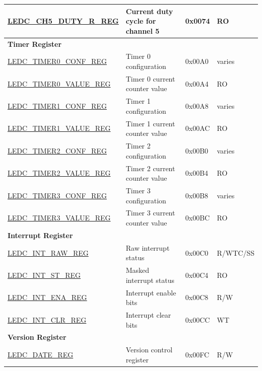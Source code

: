 \begin{longtable}{ | p{5.5cm} | p{7.2cm} | p{1.3cm} | p{1.5cm} | }
\hyperref[regdesc:LEDCCHNDUTYRREG]{LEDC\_CH5\_DUTY\_R\_REG} & Current duty cycle for channel 5 & 0x0074 & RO \\ \hline
\multicolumn{4}{|l|}{\textbf{Timer Register}} \\ \hline
\hyperref[regdesc:LEDCTIMERXCONFREG]{LEDC\_TIMER0\_CONF\_REG} & Timer 0 configuration & 0x00A0 & varies \\ \hline
\hyperref[regdesc:LEDCTIMERXVALUEREG]{LEDC\_TIMER0\_VALUE\_REG} & Timer 0 current counter value & 0x00A4 & RO \\ \hline
\hyperref[regdesc:LEDCTIMERXCONFREG]{LEDC\_TIMER1\_CONF\_REG} & Timer 1 configuration & 0x00A8 & varies \\ \hline
\hyperref[regdesc:LEDCTIMERXVALUEREG]{LEDC\_TIMER1\_VALUE\_REG} & Timer 1 current counter value & 0x00AC & RO \\ \hline
\hyperref[regdesc:LEDCTIMERXCONFREG]{LEDC\_TIMER2\_CONF\_REG} & Timer 2 configuration & 0x00B0 & varies \\ \hline
\hyperref[regdesc:LEDCTIMERXVALUEREG]{LEDC\_TIMER2\_VALUE\_REG} & Timer 2 current counter value & 0x00B4 & RO \\ \hline
\hyperref[regdesc:LEDCTIMERXCONFREG]{LEDC\_TIMER3\_CONF\_REG} & Timer 3 configuration & 0x00B8 & varies \\ \hline
\hyperref[regdesc:LEDCTIMERXVALUEREG]{LEDC\_TIMER3\_VALUE\_REG} & Timer 3 current counter value & 0x00BC & RO \\ \hline
\multicolumn{4}{|l|}{\textbf{Interrupt Register}} \\ \hline
\hyperref[regdesc:LEDCINTRAWREG]{LEDC\_INT\_RAW\_REG} & Raw interrupt status & 0x00C0 & R/WTC/SS \\ \hline
\hyperref[regdesc:LEDCINTSTREG]{LEDC\_INT\_ST\_REG} & Masked interrupt status & 0x00C4 & RO \\ \hline
\hyperref[regdesc:LEDCINTENAREG]{LEDC\_INT\_ENA\_REG} & Interrupt enable bits & 0x00C8 & R/W \\ \hline
\hyperref[regdesc:LEDCINTCLRREG]{LEDC\_INT\_CLR\_REG} & Interrupt clear bits & 0x00CC & WT \\ \hline
\multicolumn{4}{|l|}{\textbf{Version Register}} \\ \hline
\hyperref[regdesc:LEDCDATEREG]{LEDC\_DATE\_REG} & Version control register & 0x00FC & R/W \\ \hline
\end{longtable}
